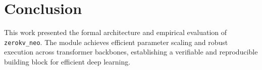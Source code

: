 \section{Conclusion}
This work presented the formal architecture and empirical evaluation of \texttt{zerokv_neo}. The module achieves efficient parameter scaling and robust execution across transformer backbones, establishing a verifiable and reproducible building block for efficient deep learning.
